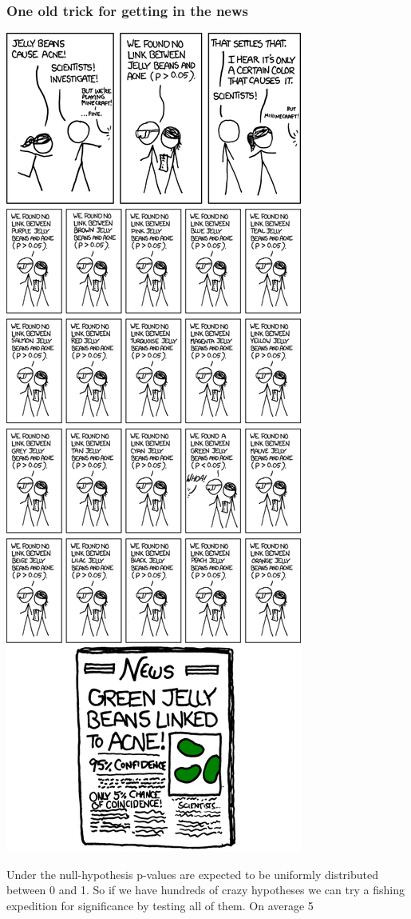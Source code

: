 \documentclass{article}\usepackage[]{graphicx}\usepackage[]{color}
\begin{document}
\subsubsection*{One old trick for getting in the news}
\includegraphics[width=.6\textwidth]{figure/significant.png}

Under the null-hypothesis p-values are expected to be uniformly distributed between 0 and 1. So if we have hundreds of crazy hypotheses we can try a fishing expedition for significance by testing all of them. On average 5%
\end{document}
